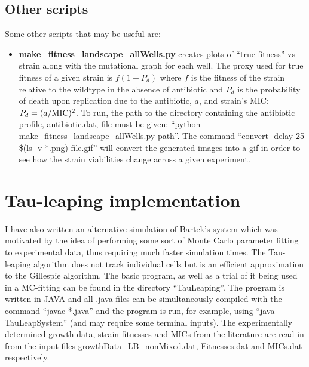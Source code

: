 \documentclass[a4paper,10pt]{article}
\begin{document}
\subsection{Other scripts}
Some other scripts that may be useful are:

\begin{itemize}
 \item {\bf make\_fitness\_landscape\_allWells.py} creates plots of ``true fitness'' vs strain along with the mutational graph for each well. The proxy used for 
 true fitness of a given strain is $f(1-P_d)$ where $f$ is the fitness of the strain relative to the wildtype in the absence of antibiotic and $P_d$ is the probability
 of death upon replication due to the antibiotic, $a$, and strain's MIC: $P_d = (a/\rm{MIC})^2$. 
 To run, the path to the directory containing the antibiotic profile, antibiotic.dat, file must be given: ``python make\_fitness\_landscape\_allWells.py path''.
 The command ``convert -delay 25 \$(ls -v *.png) file.gif'' will convert the generated images into a gif in order to see how the strain viabilities change across a given experiment.
\end{itemize}


 

 
 
 
 \clearpage
 \newpage
 
 
\section{Tau-leaping implementation} 
I have also written an alternative simulation of Bartek's system which was motivated by the idea of performing some sort of Monte Carlo parameter
fitting to experimental data, thus requiring much faster simulation times. The Tau-leaping algorithm does not track individual cells but is an
efficient approximation to the Gillespie algorithm. The basic program, as well as a trial of it being used in a MC-fitting can be found in the directory 
``TauLeaping''. The program is written in JAVA and all .java files can be simultaneously compiled with the command ``javac *.java'' and the program is run,
for example, using ``java TauLeapSystem'' (and may require some terminal inputs).
The experimentally determined growth data, strain fitnesses and MICs from the literature \cite{} are read in from the input files growthData\_LB\_nonMixed.dat, 
Fitnesses.dat and MICs.dat respectively.\\
\end{document}
